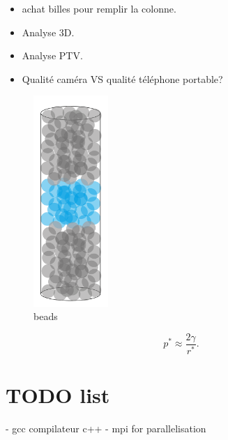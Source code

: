 \documentclass[lineno]{jfm}
\begin{document}
\begin{itemize}
    \item achat billes pour remplir la colonne.
    \item Analyse 3D.
    \item Analyse PTV.
    \item Qualité caméra VS qualité téléphone portable?
\end{itemize}


\begin{figure}
\includegraphics[height=8cm]{figures/beadsStack.png}
\caption{beads}
\label{fig:beads}
\end{figure}


% 
% 
\begin{equation}
p^{*}\approx \frac{2\gamma}{r^{*}}.\label{eq:ppit}
\end{equation}

\section{TODO list}

- gcc compilateur c++
- mpi for parallelisation
\end{document}
